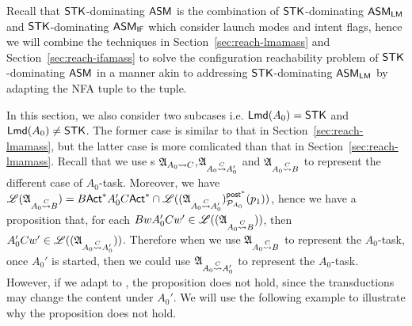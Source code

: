 Recall that $\mathsf{STK}$-dominating $\textsf{ASM}$ is the combination of $\mathsf{STK}$-dominating $\textsf{ASM}_\textsf{LM}$ and $\mathsf{STK}$-dominating $\textsf{ASM}_\textsf{IF}$ which consider launch modes and intent flags, hence we will combine the techniques in Section~\ref{sec:reach-lmamass} and Section~\ref{sec:reach-ifamass} to solve the configuration reachability problem of $\mathsf{STK}$-dominating $\textsf{ASM}$
in a manner akin to addressing $\mathsf{STK}$-dominating $\textsf{ASM}_\textsf{LM}$ by adapting the {NFA} tuple to the {\WOTrNFA} tuple. 

In this section, we also consider two subcases i.e. ${\sf Lmd}(A_0) = \mathsf{STK}$ and ${\sf Lmd}(A_0) \neq \mathsf{STK}$. The former case is similar to that in Section~\ref{sec:reach-lmamass}, but the latter case is more comlicated than that in Section~\ref{sec:reach-lmamass}. Recall that we use {\NFA}s ${\mathfrak{A} }_{A_0\rightsquigarrow C}$,${\mathfrak{A} }_{A_0\stackrel{C}\rightsquigarrow A_0'}$ and ${\mathfrak{A} }_{A_0\stackrel{C}\rightsquigarrow B}$ to represent the different case of $A_0$-task. Moreover, we have ${\mathscr{L} }({\mathfrak{A} }_{A_0\stackrel{C}\rightsquigarrow B}) = B{\sf Act}^*A_0'C{\sf Act}^*\cap{\mathscr{L} }(({\mathfrak{A} }_{A_0 \stackrel{C}\rightsquigarrow A_0'})^{{\mathsf{post} }^*}_{{\mathcal{P} }_{A_0}}(p_1))$, hence we have a proposition that, for each $BwA_0'Cw'\in{\mathscr{L} }(({\mathfrak{A} }_{A_0 \stackrel{C}\rightsquigarrow B}))$, then $A_0'Cw'\in{\mathscr{L} }(({\mathfrak{A} }_{A_0 \stackrel{C}\rightsquigarrow A_0'}))$. Therefore when we use ${\mathfrak{A} }_{A_0\stackrel{C}\rightsquigarrow B}$ to represent the $A_0$-task, once $A_0'$ is started, then we could use ${\mathfrak{A} }_{A_0 \stackrel{C}\rightsquigarrow A_0'}$ to represent the $A_0$-task. However, if we adapt {\NFA} to {\WOTrNFA}, the proposition does not hold, since the transductions may change the content under $A_0'$. We will use the following example to illustrate why the proposition does not hold.
